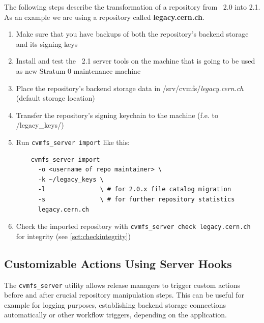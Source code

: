 The following steps describe the transformation of a repository from \cvmfs\ 2.0 into 2.1. As an example we are using a repository called \textbf{legacy.cern.ch}.
\begin{enumerate}
	\item Make sure that you have backups of both the repository's backend storage and its signing keys
	\item Install and test the \cvmfs\ 2.1 server tools on the machine that is going to be used as new Stratum 0 maintenance machine
	\item Place the repository's backend storage data in /srv/cvmfs/\textit{legacy.cern.ch} \\ (default storage location)
	\item Transfer the repository's signing keychain to the machine (f.e. to \textapprox/legacy\_keys/)
	\item Run \texttt{cvmfs\_server import} like this:
\begin{verbatim}
    cvmfs_server import
      -o <username of repo maintainer> \
      -k ~/legacy_keys \
      -l               \ # for 2.0.x file catalog migration
      -s               \ # for further repository statistics
      legacy.cern.ch
\end{verbatim}
    \item Check the imported repository with \texttt{cvmfs\_server check legacy.cern.ch} for integrity (see \ref{sct:checkintegrity})
\end{enumerate}


\subsection{Customizable Actions Using Server Hooks}
\label{sct:serverhooks}
The \texttt{cvmfs\_server} utility allows release managers to trigger custom actions before and after crucial repository manipulation steps. This can be useful for example for logging purposes, establishing backend storage connections automatically or other workflow triggers, depending on the application.

